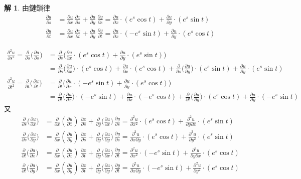 \documentclass[12pt]{extarticle}
\theoremstyle{definition}
\newtheorem*{sol}{解}
\newcommand{\pdiff}[2]{\frac{\partial #1}{\partial #2}}
\newcommand{\pdifft}[2]{\frac{\partial^2 #1}{\partial #2^2}}
\begin{document}
\begin{sol} 由鏈鎖律
  \begin{align*}
    \pdiff{u}{s} &= \pdiff{u}{x}\,\pdiff{x}{s} + \pdiff{u}{y}\,\pdiff{y}{s} = \pdiff{u}{x}\cdot(e^s\cos t) + \pdiff{u}{y}\cdot(e^s\sin t)\\
    \pdiff{u}{t} &= \pdiff{u}{x}\,\pdiff{x}{t} + \pdiff{u}{y}\,\pdiff{y}{t} = \pdiff{u}{x}\cdot(-e^s\sin t) + \pdiff{u}{y}\cdot(e^s\cos t) 
  \end{align*}

  \begin{align*}
    \pdifft{u}{s} = \pdiff{}{s}\bigg(\pdiff{u}{s}\bigg) &= \pdiff{}{s}\bigg(\pdiff{u}{x}\cdot(e^s\cos t) + \pdiff{u}{y}\cdot(e^s\sin t)\bigg)\\
    &= \pdiff{}{s}\bigg(\pdiff{u}{x}\bigg)\cdot(e^s\cos t) + \pdiff{u}{x}\cdot(e^s\cos t) + \pdiff{}{s}\bigg(\pdiff{u}{y}\bigg)\cdot(e^s\sin t) + \pdiff{u}{y}\cdot(e^s\sin t) \\
    \pdifft{u}{t} = \pdiff{}{t}\bigg(\pdiff{u}{t}\bigg) &= \pdiff{}{t}\bigg(\pdiff{u}{x}\cdot(-e^s\sin t) + \pdiff{u}{y}\cdot(e^s\cos t)\bigg)\\
    &= \pdiff{}{t}\bigg(\pdiff{u}{x}\bigg)\cdot(-e^s\sin t) + \pdiff{u}{x}\cdot(-e^s\cos t) + \pdiff{}{t}\bigg(\pdiff{u}{y}\bigg)\cdot(e^s\cos t) + \pdiff{u}{y}\cdot(-e^s\sin t)
  \end{align*}
  又
  \begin{align*}
    \pdiff{}{s}\bigg(\pdiff{u}{x}\bigg) &= \pdiff{}{x}\left(\pdiff{u}{x}\right)\,\pdiff{x}{s} + \pdiff{}{y}\bigg(\pdiff{u}{x}\bigg)\,\pdiff{y}{s} = \pdifft{u}{x}\cdot(e^s\cos t) + \frac{\partial^2 u}{\partial y\partial x}\cdot(e^s\sin t)\\
  \pdiff{}{s}\bigg(\pdiff{u}{y}\bigg) &= \pdiff{}{x}\left(\pdiff{u}{y}\right)\,\pdiff{x}{s} + \pdiff{}{y}\bigg(\pdiff{u}{y}\bigg)\,\pdiff{y}{s} = \frac{\partial^2 u}{\partial x\partial y}\cdot(e^s\cos t) + \pdifft{u}{y}\cdot(e^s\sin t) \\
    \pdiff{}{t}\bigg(\pdiff{u}{x}\bigg) &= \pdiff{}{x}\left(\pdiff{u}{x}\right)\,\pdiff{x}{t} + \pdiff{}{y}\bigg(\pdiff{u}{x}\bigg)\,\pdiff{y}{t} = \pdifft{u}{x}\cdot(-e^s\sin t) + \frac{\partial^2 u}{\partial y\partial x}\cdot(e^s\cos t)\\
  \pdiff{}{t}\bigg(\pdiff{u}{y}\bigg) &= \pdiff{}{x}\left(\pdiff{u}{y}\right)\,\pdiff{x}{t} + \pdiff{}{y}\bigg(\pdiff{u}{y}\bigg)\,\pdiff{y}{t} = \frac{\partial^2 u}{\partial x\partial y}\cdot(-e^s\sin t) + \pdifft{u}{y}\cdot(e^s\cos t)
  \end{align*}

\end{sol}
\end{document}
